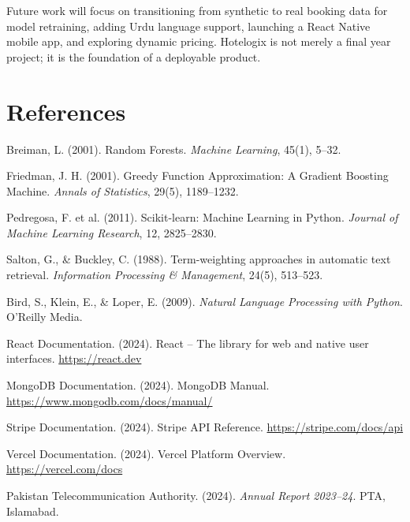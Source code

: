 \documentclass[12pt,a4paper]{report}
\begin{document}
Future work will focus on transitioning from synthetic to real booking data for model retraining, adding Urdu language support, launching a React Native mobile app, and exploring dynamic pricing. Hotelogix is not merely a final year project; it is the foundation of a deployable product.

\chapter*{References}

\begin{enumerate}[leftmargin=*, label={[\arabic*]}]
  \item Breiman, L. (2001). Random Forests. \textit{Machine Learning}, 45(1), 5--32.
  \item Friedman, J. H. (2001). Greedy Function Approximation: A Gradient Boosting Machine. \textit{Annals of Statistics}, 29(5), 1189--1232.
  \item Pedregosa, F. et al. (2011). Scikit-learn: Machine Learning in Python. \textit{Journal of Machine Learning Research}, 12, 2825--2830.
  \item Salton, G., \& Buckley, C. (1988). Term-weighting approaches in automatic text retrieval. \textit{Information Processing \& Management}, 24(5), 513--523.
  \item Bird, S., Klein, E., \& Loper, E. (2009). \textit{Natural Language Processing with Python}. O'Reilly Media.
  \item React Documentation. (2024). React -- The library for web and native user interfaces. \url{https://react.dev}
  \item MongoDB Documentation. (2024). MongoDB Manual. \url{https://www.mongodb.com/docs/manual/}
  \item Stripe Documentation. (2024). Stripe API Reference. \url{https://stripe.com/docs/api}
  \item Vercel Documentation. (2024). Vercel Platform Overview. \url{https://vercel.com/docs}
  \item Pakistan Telecommunication Authority. (2024). \textit{Annual Report 2023--24}. PTA, Islamabad.
\end{enumerate}
\end{document}
